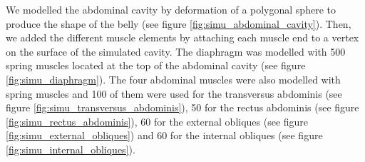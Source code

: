 We modelled the abdominal cavity by deformation of a polygonal sphere to produce the shape of the belly (see figure \ref{fig:simu_abdominal_cavity}). Then, we added the different muscle elements by attaching each muscle end to a vertex on the surface of the simulated cavity. The diaphragm was modelled with 500 spring muscles located at the top of the abdominal cavity (see figure \ref{fig:simu_diaphragm}). The four abdominal muscles were also modelled with spring muscles and 100 of them were used for the transversus abdominis (see figure \ref{fig:simu_transversus_abdominis}), 50 for the rectus abdominis (see figure \ref{fig:simu_rectus_abdominis}), 60 for the external obliques (see figure \ref{fig:simu_external_obliques}) and 60 for the internal obliques (see figure \ref{fig:simu_internal_obliques}).

\begin{figure}
\centering
{}
\end{figure}
